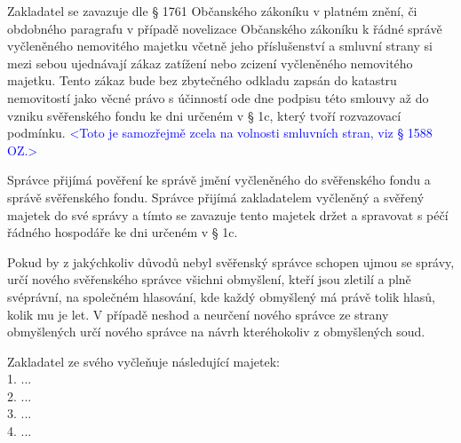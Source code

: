\documentclass[parskip=half]{scrreprt}
\begin{document}
\begin{contract}

Zakladatel se zavazuje dle § 1761 Občanského zákoníku v platném znění, či obdobného paragrafu v případě novelizace Občanského zákoníku k řádné správě vyčleněného nemovitého majetku včetně jeho příslušenství a smluvní strany si mezi sebou ujednávají zákaz zatížení nebo zcizení vyčleněného nemovitého majetku. Tento zákaz bude bez zbytečného odkladu zapsán do katastru nemovitostí jako věcné právo s účinností ode dne podpisu této smlouvy až do vzniku svěřenského fondu ke dni určeném v § 1c, který tvoří rozvazovací podmínku. \textcolor{blue}{<Toto je samozřejmě zcela na volnosti smluvních stran, viz § 1588 OZ.>}



Správce přijímá pověření ke správě jmění vyčleněného do svěřenského fondu a správě svěřenského fondu. Správce přijímá zakladatelem vyčleněný a svěřený majetek do své správy a tímto se zavazuje tento majetek držet a spravovat s péčí řádného hospodáře ke dni určeném v § 1c.

Pokud by z jakýchkoliv důvodů nebyl svěřenský správce schopen ujmou se správy, určí nového svěřenského správce všichni obmyšlení, kteří jsou zletilí a plně svéprávní, na společném hlasování, kde každý obmyšlený má právě tolik hlasů, kolik mu je let. V případě neshod a neurčení nového správce ze strany obmyšlených určí nového správce na návrh kteréhokoliv z obmyšlených soud.

Zakladatel ze svého vyčleňuje následující majetek:\\
1. ...\\
2. ...\\
3. ...\\
4. ...\\



\end{contract}
\end{document}
